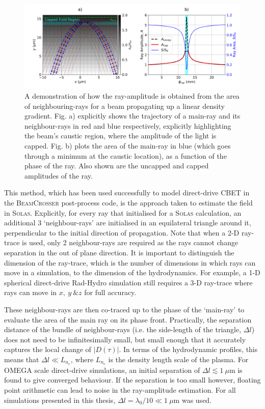 \begin{figure}[t!]
    \includegraphics[width=\linewidth]{Numerics/Images/FieldCap_Diagram.png}
    \centering
    \caption{A demonstration of how the ray-amplitude is obtained from the area of neighbouring-rays for a beam propagating up a linear density gradient.
    Fig. a) explicitly shows the trajectory of a main-ray and its neighbour-rays in red and blue respectively, explicitly highlighting the beam's caustic region, where the amplitude of the light is capped.
    Fig. b) plots the area of the main-ray in blue (which goes through a minimum at the caustic location), as a function of the phase of the ray.
    Also shown are the uncapped and capped amplitudes of the ray.}%
    \label{fig:SOLAS_fieldcap_diagram}
\end{figure}

This method, which has been used successfully to model direct-drive \ac{CBET} in the \textsc{BeamCrosser} post-process code, is the approach taken to estimate the field in \textsc{Solas}.
Explicitly, for every ray that initialised for a \textsc{Solas} calculation, an additional 3 `neighbour-rays' are initialised in an equilateral triangle around it, perpendicular to the initial direction of propagation.
Note that when a 2-D ray-trace is used, only 2 neighbour-rays are required as the rays cannot change separation in the out of plane direction.
It is important to distinguish the dimension of the ray-trace, which is the number of dimensions in which rays can move in a simulation, to the dimension of the hydrodynamics.
For example, a 1-D spherical direct-drive \ac{Rad-Hydro} simulation still requires a 3-D ray-trace where rays can move in $x,\ y\ \&z$ for full accuracy.

These neighbour-rays are then co-traced up to the phase of the `main-ray' to evaluate the area of the main ray on its phase front.
Practically, the separation distance of the bundle of neighbour-rays (i.e. the side-length of the triangle, $\Delta l$) does not need to be infinitesimally small, but small enough that it accurately captures the local change of $|D(\tau)|$.
In terms of the hydrodynamic profiles, this means that $\Delta l \ll L_{n_e}$, where $L_{n_e}$ is the density length scale of the plasma.
For OMEGA scale direct-drive simulations, an initial separation of $\Delta l\lesssim 1\ \mu\text{m}$ is found to give converged behaviour.
If the separation is too small however, floating point arithmetic can lead to noise in the ray-amplitude estimation.
For all simulations presented in this thesis, $\Delta l=\lambda_0/10\ll1\ \mu\text{m}$ was used.


